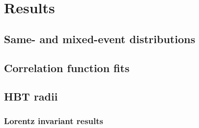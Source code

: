 \chapter{Results}
\label{ch:results}
\graphicspath{{Chapter-Results/figures/}}

\section{Same- and mixed-event distributions}
\section{Correlation function fits}

\FloatBarrier
\section{HBT radii}
\subsection{Lorentz invariant results}
\label{subsec:invariant_results}

